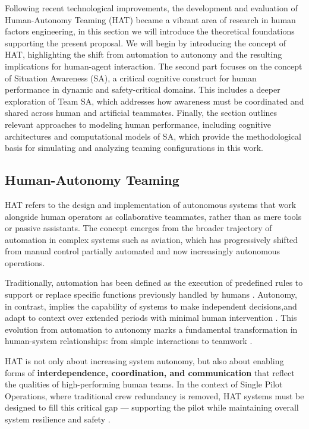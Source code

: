 \documentclass[12pt,a4paper]{article} %
\begin{document}
	Following recent technological improvements, the development and evaluation of Human-Autonomy Teaming (HAT) became a vibrant area of research in human factors engineering, in this section we will introduce the theoretical foundations supporting the present proposal. We will begin by introducing the concept of HAT, highlighting the shift from automation to autonomy and the resulting implications for human-agent interaction. The second part focuses on the concept of Situation Awareness (SA), a critical cognitive construct for human performance in dynamic and safety-critical domains. This includes a deeper exploration of Team SA, which addresses how awareness must be coordinated and shared across human and artificial teammates. Finally, the section outlines relevant approaches to modeling human performance, including cognitive architectures and computational models of SA, which provide the methodological basis for simulating and analyzing teaming configurations in this work.

	\subsection{Human-Autonomy Teaming}

	HAT refers to the design and implementation of autonomous systems that work alongside human operators as collaborative teammates, rather than as mere tools or passive assistants. The concept emerges from the broader trajectory of automation in complex systems such as aviation, which has progressively shifted from manual control partially automated and now increasingly autonomous operations.

	Traditionally, automation has been defined as the execution of predefined rules to support or replace specific functions previously handled by humans \parencite{parasuraman_model_2000,hancock_imposing_2017,hoff_trust_2015}. Autonomy, in contrast, implies the capability of systems to make independent decisions,and adapt to context over extended periods with minimal human intervention \parencite{endsley_here_2017-1,holbrook_enabling_2020}. This evolution from automation to autonomy marks a fundamental transformation in human-system relationships: from simple interactions to teamwork \parencite{endsley_here_2017-1}.

	HAT is not only about increasing system autonomy, but also about enabling forms of \textbf{interdependence, coordination, and communication} that reflect the qualities of high-performing human teams. In the context of Single Pilot Operations, where traditional crew redundancy is removed, HAT systems must be designed to fill this critical gap — supporting the pilot while maintaining overall system resilience and safety \parencite{mcneese_chapter_2020}.
\end{document}
